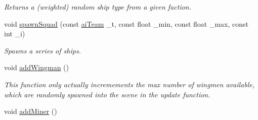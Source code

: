 \begin{DoxyCompactItemize}
\begin{DoxyCompactList}\small\item\em Returns a (weighted) random ship type from a given faction. \end{DoxyCompactList}\item 
void \hyperlink{classuniverse_a4da6321942cd454ac4cadc8d3ccb1740}{spawn\-Squad} (const \hyperlink{enemy_8hpp_abac1fdbabb5a6be5f0d6ae40be5c5a58}{ai\-Team} \-\_\-t, const float \-\_\-min, const float \-\_\-max, const int \-\_\-i)
\begin{DoxyCompactList}\small\item\em Spawns a series of ships. \end{DoxyCompactList}\item 
\hypertarget{classuniverse_aacf31e60bd0e853b488e6a757e1c5c0a}{void \hyperlink{classuniverse_aacf31e60bd0e853b488e6a757e1c5c0a}{add\-Wingman} ()}\label{classuniverse_aacf31e60bd0e853b488e6a757e1c5c0a}

\begin{DoxyCompactList}\small\item\em This function only actually incremements the max number of wingmen available, which are randomly spawned into the scene in the update function. \end{DoxyCompactList}\item 
\hypertarget{classuniverse_af7fcdf7e564fbeabf2e48e698dfc1aad}{void \hyperlink{classuniverse_af7fcdf7e564fbeabf2e48e698dfc1aad}{add\-Miner} ()}\label{classuniverse_af7fcdf7e564fbeabf2e48e698dfc1aad}


\end{DoxyCompactItemize}
